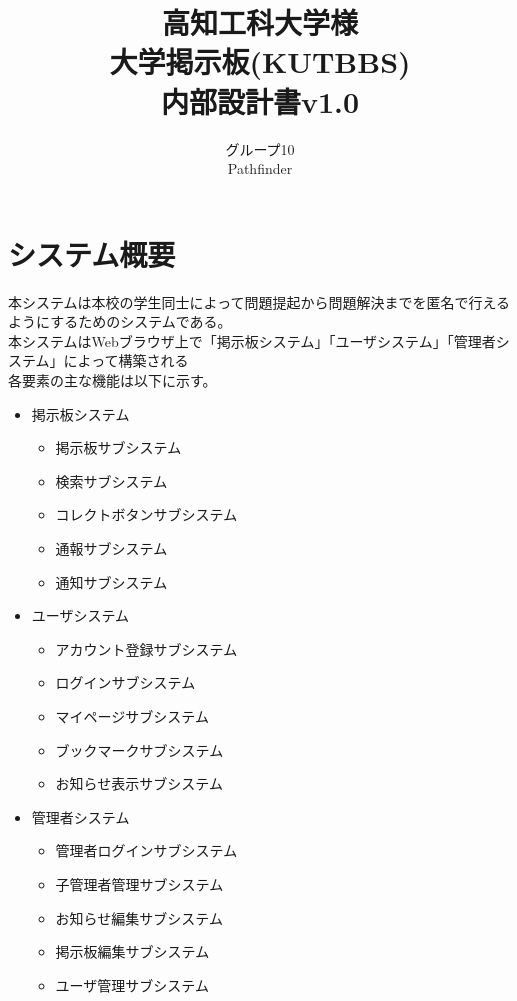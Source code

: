 \documentclass[a4j]{jarticle}
\title{
\vspace{30mm}
{\bf 高知工科大学様}\\
\vspace{5mm}
大学掲示板(KUTBBS)\\
\vspace{5mm}
{\bf  内部設計書v1.0}
\vspace{90mm}
}
\author{
\vspace{5mm}
グループ10 \\
\vspace{5mm}
Pathfinder \\
\vspace{5mm}
\vspace{10mm}
}
\begin{document}
\maketitle
\newpage
\tableofcontents
\newpage


 \section{システム概要}
本システムは本校の学生同士によって問題提起から問題解決までを匿名で行えるようにするためのシステムである。\\
本システムはWebブラウザ上で「掲示板システム」「ユーザシステム」「管理者システム」によって構築される\\
各要素の主な機能は以下に示す。
\begin{itemize}
\item 掲示板システム
	\begin{itemize}
	\item 掲示板サブシステム
	\item 検索サブシステム
	\item コレクトボタンサブシステム
	\item 通報サブシステム
	\item 通知サブシステム
	\end{itemize}
\item ユーザシステム
	\begin{itemize}
	\item アカウント登録サブシステム
	\item ログインサブシステム
	\item マイページサブシステム
	\item ブックマークサブシステム
	\item お知らせ表示サブシステム
	\end{itemize}
\item 管理者システム
	\begin{itemize}
	\item 管理者ログインサブシステム
	\item 子管理者管理サブシステム
	\item お知らせ編集サブシステム
	\item 掲示板編集サブシステム
	\item ユーザ管理サブシステム
	\end{itemize}
\end{itemize}
\end{document}
